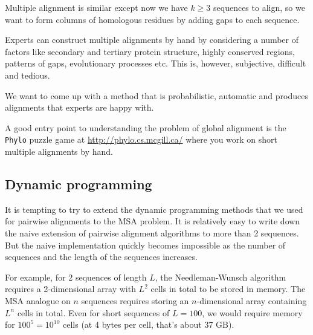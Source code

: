 \documentclass[11pt]{article}
\begin{document}
Multiple alignment is similar except now we have $k \geq 3$ sequences to align, so we want to form columns of homologous residues by adding gaps to each sequence.  

Experts can construct multiple alignments by hand by considering a number of factors like secondary and tertiary protein structure, highly conserved regions, patterns of gaps, evolutionary processes etc.    This is, however, subjective, difficult and tedious. 

We want to come up with a method that is probabilistic, automatic and produces alignments that experts are happy with.

A good entry point to understanding the problem of global alignment is the {\tt Phylo} puzzle game at \url{http://phylo.cs.mcgill.ca/} where you work on short multiple alignments by hand. 



%
%
%

\subsection{Dynamic programming}

It is tempting to try to extend the dynamic programming methods that we used for pairwise alignments to the MSA problem.  It is relatively easy to write down the naive extension of pairwise alignment algorithms to more than 2 sequences. But the naive implementation quickly becomes impossible as the number of sequences and the length of the sequences increases.  

For example, for 2 sequences of length $L$, the Needleman-Wunsch algorithm requires a 2-dimensional array with $L^2$ cells in total to be stored in memory.  The MSA analogue on $n$ sequences  requires storing an $n$-dimensional array containing  $L^n$ cells in total.  Even for short sequences of $L = 100$, we would require memory for $100^5 = 10^{10}$ cells (at 4 bytes per cell, that's about 37 GB).  
\end{document}
